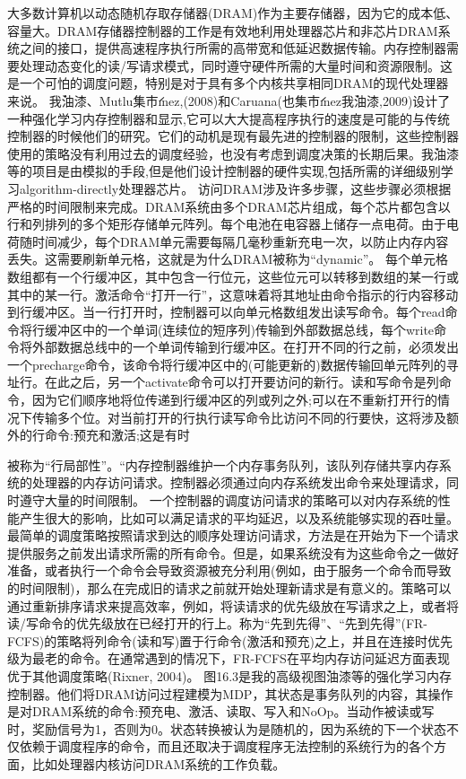 大多数计算机以动态随机存取存储器(DRAM)作为主要存储器，因为它的成本低、容量大。DRAM存储器控制器的工作是有效地利用处理器芯片和非芯片DRAM系统之间的接口，提供高速程序执行所需的高带宽和低延迟数据传输。内存控制器需要处理动态变化的读/写请求模式，同时遵守硬件所需的大量时间和资源限制。这是一个可怕的调度问题，特别是对于具有多个内核共享相同DRAM的现代处理器来说。
我̇油漆、Mutlu集市́ınez,(2008)和Caruana(也集市́ınez我̇油漆,2009)设计了一种强化学习内存控制器和显示,它可以大大提高程序执行的速度是可能的与传统控制器的时候他们的研究。它们的动机是现有最先进的控制器的限制，这些控制器使用的策略没有利用过去的调度经验，也没有考虑到调度决策的长期后果。我̇油漆等的项目是由模拟的手段,但是他们设计控制器的硬件实现,包括所需的详细级别学习algorithm-directly处理器芯片。
访问DRAM涉及许多步骤，这些步骤必须根据严格的时间限制来完成。DRAM系统由多个DRAM芯片组成，每个芯片都包含以行和列排列的多个矩形存储单元阵列。每个电池在电容器上储存一点电荷。由于电荷随时间减少，每个DRAM单元需要每隔几毫秒重新充电一次，以防止内存内容丢失。这需要刷新单元格，这就是为什么DRAM被称为“dynamic”。
每个单元格数组都有一个行缓冲区，其中包含一行位元，这些位元可以转移到数组的某一行或其中的某一行。激活命令“打开一行”，这意味着将其地址由命令指示的行内容移动到行缓冲区。当一行打开时，控制器可以向单元格数组发出读写命令。每个read命令将行缓冲区中的一个单词(连续位的短序列)传输到外部数据总线，每个write命令将外部数据总线中的一个单词传输到行缓冲区。在打开不同的行之前，必须发出一个precharge命令，该命令将行缓冲区中的(可能更新的)数据传输回单元阵列的寻址行。在此之后，另一个activate命令可以打开要访问的新行。读和写命令是列命令，因为它们顺序地将位传递到行缓冲区的列或列之外;可以在不重新打开行的情况下传输多个位。对当前打开的行执行读写命令比访问不同的行要快，这将涉及额外的行命令:预充和激活;这是有时


被称为“行局部性”。“内存控制器维护一个内存事务队列，该队列存储共享内存系统的处理器的内存访问请求。控制器必须通过向内存系统发出命令来处理请求，同时遵守大量的时间限制。
一个控制器的调度访问请求的策略可以对内存系统的性能产生很大的影响，比如可以满足请求的平均延迟，以及系统能够实现的吞吐量。最简单的调度策略按照请求到达的顺序处理访问请求，方法是在开始为下一个请求提供服务之前发出请求所需的所有命令。但是，如果系统没有为这些命令之一做好准备，或者执行一个命令会导致资源被充分利用(例如，由于服务一个命令而导致的时间限制)，那么在完成旧的请求之前就开始处理新请求是有意义的。策略可以通过重新排序请求来提高效率，例如，将读请求的优先级放在写请求之上，或者将读/写命令的优先级放在已经打开的行上。称为“先到先得”、“先到先得”(FR-FCFS)的策略将列命令(读和写)置于行命令(激活和预充)之上，并且在连接时优先级为最老的命令。在通常遇到的情况下，FR-FCFS在平均内存访问延迟方面表现优于其他调度策略(Rixner, 2004)。
图16.3是我的高级视图̇油漆等的强化学习内存控制器。他们将DRAM访问过程建模为MDP，其状态是事务队列的内容，其操作是对DRAM系统的命令:预充电、激活、读取、写入和NoOp。当动作被读或写时，奖励信号为1，否则为0。状态转换被认为是随机的，因为系统的下一个状态不仅依赖于调度程序的命令，而且还取决于调度程序无法控制的系统行为的各个方面，比如处理器内核访问DRAM系统的工作负载。
 

